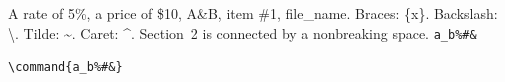 \documentclass[11pt]{article}
\begin{document}
A rate of 5\%, a price of \$10, A\&B, item \#1, file\_name.
Braces: \{x\}. Backslash: \textbackslash.
Tilde: \textasciitilde. Caret: \textasciicircum.
Section~2 is connected by a nonbreaking space.
\verb|a_b%#&|
\begin{verbatim}
\command{a_b%#&}
\end{verbatim}
\texttt{}
\end{document}
